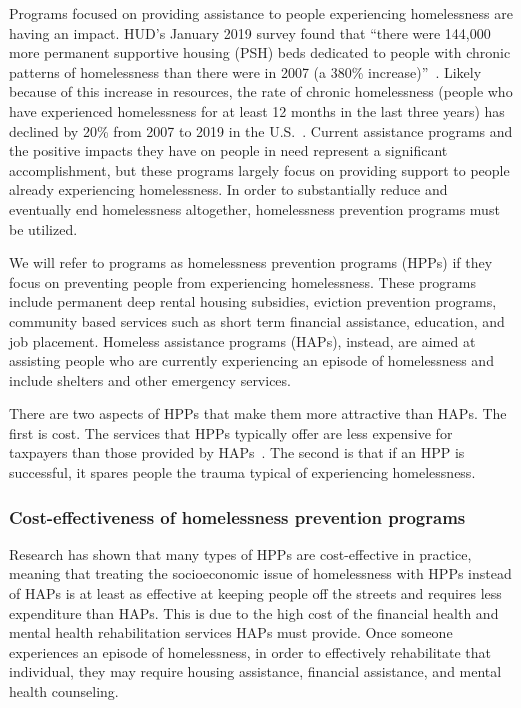 \documentclass[10pt,letterpaper]{article}
\begin{document}
Programs focused on providing assistance to people experiencing homelessness are having an impact. HUD's January 2019 survey found that ``there were 144,000 more permanent supportive housing (PSH) beds dedicated to people with chronic patterns of homelessness than there were in 2007 (a 380\% increase)''~\cite{2019AHAR}. Likely because of this increase in resources, the rate of chronic homelessness (people who have experienced homelessness for at least 12 months in the last three years) has declined by 20\% from 2007 to 2019 in the U.S.~\cite{2019AHAR}. Current assistance programs and the positive impacts they have on people in need represent a significant accomplishment, but these programs largely focus on providing support to people already experiencing homelessness. In order to substantially reduce and eventually end homelessness altogether, homelessness prevention programs must be utilized. 

We will refer to programs as homelessness prevention programs (HPPs) if they focus on preventing people from experiencing homelessness. These programs include permanent deep rental housing subsidies, eviction prevention programs, community based services such as short term financial assistance, education, and job placement. Homeless assistance programs (HAPs), instead, are aimed at assisting people who are currently experiencing an episode of homelessness and include shelters and other emergency services. 

There are two aspects of HPPs that make them more attractive than HAPs. The first is cost. The services that HPPs typically offer are less expensive for taxpayers than those provided by HAPs~\cite{shinn2019homelessness}. The second is that if an HPP is successful, it spares people the trauma typical of experiencing homelessness.

\subsubsection*{Cost-effectiveness of homelessness prevention programs}
Research has shown that many types of HPPs are cost-effective in practice, meaning that treating the socioeconomic issue of homelessness with HPPs instead of HAPs is at least as effective at keeping people off the streets and requires less expenditure than HAPs. This is due to the high cost of the financial health and mental health rehabilitation services HAPs must provide. Once someone experiences an episode of homelessness, in order to effectively rehabilitate that individual, they may require housing assistance, financial assistance, and mental health counseling.
\end{document}
